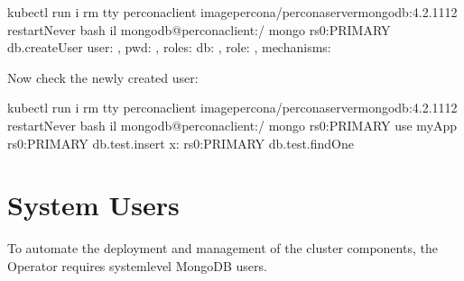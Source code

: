 \documentclass[letterpaper,10pt,english]{sphinxmanual}
\begin{document}
\begin{sphinxVerbatim}[commandchars=\\\{\}]
\PYGZdl{} kubectl run \PYGZhy{}i \PYGZhy{}\PYGZhy{}rm \PYGZhy{}\PYGZhy{}tty percona\PYGZhy{}client \PYGZhy{}\PYGZhy{}imagepercona/percona\PYGZhy{}server\PYGZhy{}mongodb:4.2.11\PYGZhy{}12 \PYGZhy{}\PYGZhy{}restartNever \PYGZhy{}\PYGZhy{} bash \PYGZhy{}il
mongodb@percona\PYGZhy{}client:/\PYGZdl{} mongo 
rs0:PRIMARY\PYGZgt{} db.createUser
    user: ,
    pwd: ,
    roles: \PYG{o}{[}
       db: , role:  
    \PYG{o}{]},
    mechanisms: \PYG{o}{[}
    \PYG{o}{]}

\end{sphinxVerbatim}

Now check the newly created user:

\begin{sphinxVerbatim}[commandchars=\\\{\}]
\PYGZdl{} kubectl run \PYGZhy{}i \PYGZhy{}\PYGZhy{}rm \PYGZhy{}\PYGZhy{}tty percona\PYGZhy{}client \PYGZhy{}\PYGZhy{}imagepercona/percona\PYGZhy{}server\PYGZhy{}mongodb:4.2.11\PYGZhy{}12 \PYGZhy{}\PYGZhy{}restartNever \PYGZhy{}\PYGZhy{} bash \PYGZhy{}il
mongodb@percona\PYGZhy{}client:/\PYGZdl{} mongo 
rs0:PRIMARY\PYGZgt{} use myApp
rs0:PRIMARY\PYGZgt{} db.test.insert x:  
rs0:PRIMARY\PYGZgt{} db.test.findOne
\end{sphinxVerbatim}


\section{System Users}
\label{\detokenize{users:users-system-users}}\label{\detokenize{users:id3}}
To automate the deployment and management of the cluster components,
the Operator requires system\sphinxhyphen{}level MongoDB users.
\end{document}
